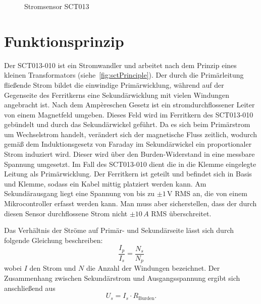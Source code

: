 	
	
	
	\begin{figure}[H]
		\centering
		\caption{Stromsensor SCT013}
		\label{fig:sctGeneral}
	\end{figure}
	

\section{Funktionsprinzip \label{sctFunctionPrinciple}}
	Der SCT013-010 ist ein Stromwandler und arbeitet nach dem Prinzip eines kleinen Transformators (siehe~\autoref{fig:sctPrinciple}). Der durch die Primärleitung flie{\ss}ende Strom bildet die einwindige Primärwicklung, während auf der Gegenseite des Ferritkerns eine Sekundärwicklung mit vielen Windungen angebracht ist. Nach dem Ampèreschen Gesetz ist ein stromdurchflossener Leiter von einem Magnetfeld umgeben. Dieses Feld wird im Ferritkern des SCT013-010 gebündelt und durch das Sekundärwickel geführt. Da es sich beim Primärstrom um Wechselstrom handelt, verändert sich der magnetische Fluss zeitlich, wodurch gemä{\ss} dem Induktionsgesetz von Faraday im Sekundärwickel ein proportionaler Strom induziert wird. Dieser wird über den Burden-Widerstand in eine messbare Spannung umgesetzt. Im Fall des SCT013-010 dient die in die Klemme eingelegte Leitung als Primärwicklung. Der Ferritkern ist geteilt und befindet sich in Basis und Klemme, sodass ein Kabel mittig platziert werden kann. Am Sekundärausgang liegt eine Spannung von bis zu $\pm 1\,\text{V}$ RMS an, die von einem Mikrocontroller erfasst werden kann. Man muss aber sicherstellen, dass der durch diesen Sensor durchflossene Strom nicht $\pm 10\,A$ RMS überschreitet.

	Das Verhältnis der Ströme auf Primär- und Sekundärseite lässt sich durch folgende Gleichung beschreiben:
	\begin{equation}
		\frac{I_p}{I_s} = \frac{N_s}{N_p}
	\end{equation}
	wobei $I$ den Strom und $N$ die Anzahl der Windungen bezeichnet. Der Zusammenhang zwischen Sekundärstrom und Ausgangsspannung ergibt sich anschlie{\ss}end aus
	\begin{equation}
		U_s = I_s \cdot R_\text{Burden}.
	\end{equation}
	
